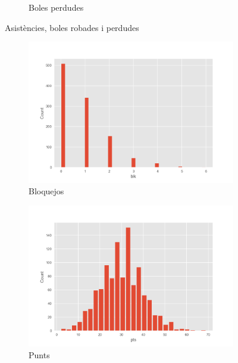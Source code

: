 \documentclass{article}
\begin{document}
\begin{figure}[!h]
\begin{subfigure}[b]{0.25\textwidth}
		\caption*{Boles perdudes}
		\label{fig:hist22}
	\end{subfigure}
	\caption{Asistències, boles robades i perdudes}
	\label{fig:hist20}
\end{figure}
\begin{figure}[!h]
	\centering
	\begin{subfigure}[b]{0.25\textwidth}
		\centering
		\includegraphics[width=\textwidth]{hist21}
		\caption*{Bloquejos}
		\label{fig:hist21}
	\end{subfigure}
	\hfill
	\begin{subfigure}[b]{0.25\textwidth}
		\centering
		\includegraphics[width=\textwidth]{hist23}
		\caption*{Punts}
		\label{fig:hist23}
	\end{subfigure}
	\hfill
	\begin{subfigure}[b]{0.25\textwidth}
		\centering

\end{subfigure}
\end{figure}
\end{document}
